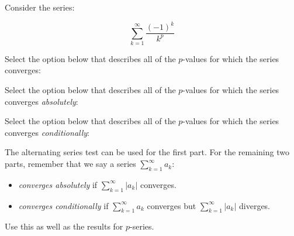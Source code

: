 \documentclass{ximera}
\author{Jim Talamo}
\begin{document}
\begin{exercise}

Consider the series:

\[
\sum_{k=1}^{\infty} \frac{(-1)^k}{k^p}
\] 

Select the option below that describes all of the $p$-values for which the series converges:

\begin{multipleChoice}
\end{multipleChoice}

Select the option below that describes all of the $p$-values for which the series converges \emph{absolutely}:

\begin{multipleChoice}
\end{multipleChoice}

Select the option below that describes all of the $p$-values for which the series converges \emph{conditionally}:

\begin{multipleChoice}
\end{multipleChoice}

\begin{hint}
The alternating series test can be used for the first part.  For the remaining two parts, remember that we say a series $\sum_{k=1}^{\infty} a_k$:

\begin{itemize}
\item \emph{converges absolutely} if $\sum_{k=1}^{\infty} |a_k|$ converges.
\item  \emph{converges conditionally} if $\sum_{k=1}^{\infty} a_k$ converges but $\sum_{k=1}^{\infty} |a_k|$ diverges.
\end{itemize}

Use this as well as the results for $p$-series.
\end{hint}

\end{exercise}
\end{document}
